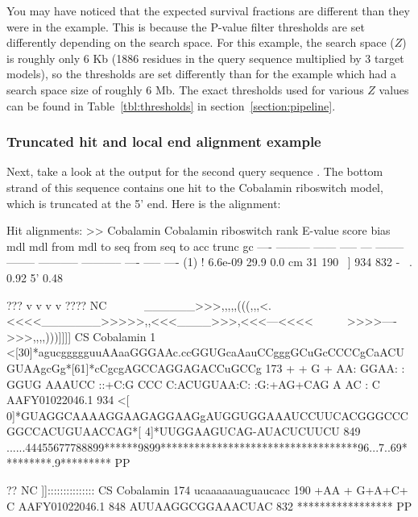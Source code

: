 You may have noticed that the expected survival fractions are
different than they were in the  example. This is
because the P-value filter thresholds are set differently depending on
the search space. For this example, the search space ($Z$) is roughly
only 6 Kb (1886 residues in the query sequence multiplied by 3 target
models), so the thresholds are set differently than for the
 example which had a search space size of roughly 6
Mb. The exact thresholds used for various $Z$ values can be found in
Table~\ref{tbl:thresholds} in section~\ref{section:pipeline}.

\subsubsection{Truncated hit and local end alignment example}
Next, take a look at the  output for the second query
sequence . The bottom strand of this sequence
contains one hit to the Cobalamin riboswitch model, which is truncated
at the 5' end. Here is the alignment:

\begin{widesreoutput}
Hit alignments:
>> Cobalamin  Cobalamin riboswitch
 rank     E-value  score  bias mdl mdl from   mdl to       seq from      seq to       acc trunc   gc
 ----   --------- ------ ----- --- -------- --------    ----------- -----------      ---- ----- ----
  (1) !   6.6e-09   29.9   0.0  cm       31      190 ~]         934         832 - ~. 0.92    5' 0.48

                                 ???              v           v      v    v                                     ???? NC
                     ~~~~~~______>>>,,,,,(((,,,<.<<<<_______>>>>>,,<<<____>>>,<<<---<<<<~~~~~~>>>>---->>>,,,,)))]]]] CS
       Cobalamin   1 <[30]*agucggggguuAAaaGGGAAc.ccGGUGcaAauCCgggGCuGcCCCCgCaACUGUAAgcGg*[61]*cCgcgAGCCAGGAGACCuGCCg 173
                           + + G     + AA: GGAA: : GGUG AAAUCC ::+C:G CCC  C:ACUGUAA:C:        :G:+AG+CAG A AC :  C 
  AAFY01022046.1 934 <[ 0]*GUAGGCAAAAGGAAGAGGAAGgAUGGUGGAAAUCCUUCACGGGCCCGGCCACUGUAACCAG*[ 4]*UUGGAAGUCAG-AUACUCUUCU 849
                     ......44455677788899******9899***********************************96...7..69*********.9********* PP

                     ??                NC
                     ]]::::::::::::::: CS
       Cobalamin 174 ucaaaaauaguaucacc 190
                       +AA +  G+A+C+ C
  AAFY01022046.1 848 AUUAAGGCGGAAACUAC 832
                     ***************** PP
\end{widesreoutput}


